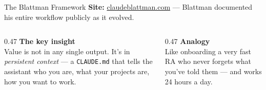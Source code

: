 \documentclass[aspectratio=169, 10pt]{beamer}
\begin{document}
\begin{frame}{The Blattman Framework}
  \textbf{Site:} \href{https://claudeblattman.com}{claudeblattman.com}
  --- Blattman documented his entire workflow publicly as it evolved.

  \vspace{0.7em}
  \begin{center}
  \end{center}
  \vspace{0.5em}

  \begin{columns}[T]
    \begin{column}{0.47\textwidth}
      \textbf{The key insight}\\
      \small Value is not in any single output.
      It's in \textit{persistent context} --- a \texttt{CLAUDE.md} that tells
      the assistant who you are, what your projects are, how you want to work.
    \end{column}
    \begin{column}{0.47\textwidth}
      \textbf{Analogy}\\
      \small Like onboarding a very fast RA who never forgets what you've
      told them --- and works 24 hours a day.
    \end{column}
  \end{columns}
\end{frame}
\end{document}
